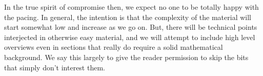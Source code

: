 \documentclass[12pt,oneside]{../../sfsuthesis}
\begin{document}
In the true spirit of compromise then, we expect no one to be totally happy with the pacing.
In general, the intention is that the complexity of the material will start somewhat low and increase as we go on.
But, there will be technical points interjected in otherwise easy material, and we will attempt to include high level overviews even in sections that really do require a solid mathematical background.
We say this largely to give the reader permission to skip the bits that simply don't interest them.
\end{document}
